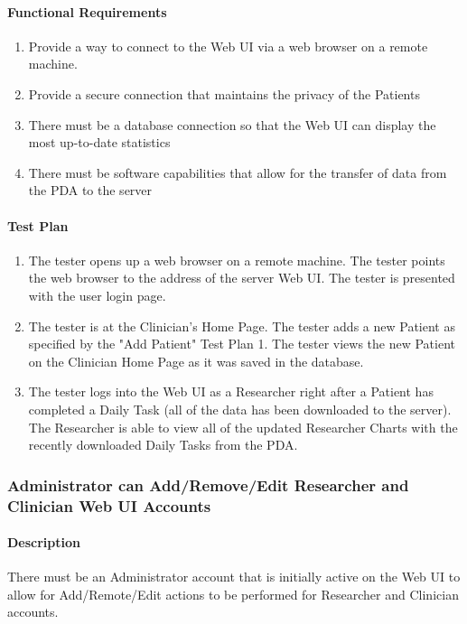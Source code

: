 \documentclass{article}
\begin{document}
\paragraph {Functional Requirements}
\begin{enumerate}
\item Provide a way to connect to the Web UI via a web browser on a remote machine.
\item Provide a secure connection that maintains the privacy of the Patients 	 
\item There must be a database connection so that the Web UI can display the most up-to-date statistics	
\item There must be software capabilities that allow for the transfer of data from the PDA to the server
\end{enumerate}

\paragraph {Test Plan}
\begin{enumerate}
\item The tester opens up a web browser on a remote machine. The tester points the web browser to the address of the server Web UI. The tester is presented with the user login page.
\item The tester is at the Clinician's Home Page. The tester adds a new Patient as specified by the "Add Patient" Test Plan 1. The tester views the new Patient on the Clinician Home Page as it was saved in the database. 
\item The tester logs into the Web UI as a Researcher right after a Patient has completed a Daily Task (all of the data has been downloaded to the server). The Researcher is able to view all of the updated Researcher Charts with the recently downloaded Daily Tasks from the PDA.  
\end{enumerate}

\subsubsection {Administrator can Add/Remove/Edit Researcher and Clinician Web UI Accounts} \label{sec: Administrator Add/Remote/Edit}
\paragraph {Description}
There must be an Administrator account that is initially active on the Web UI to allow for Add/Remote/Edit actions to be performed for Researcher and Clinician accounts.
\end{document}
